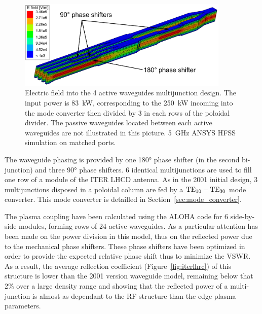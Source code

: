{\begin{figure}[h]
	\centering{}\includegraphics[width=0.9\textwidth]{figures/chap3/ITER_antenna/LH4ITER_MJ_4awg}
	\caption{Electric field into the 4 active waveguides multijunction design.
		The input power is 83~kW, corresponding to the 250~kW incoming
		into the mode converter then divided by 3 in each rows of the poloidal
		divider. The passive waveguides located between each active waveguides
		are not illustrated in this picture. 5~GHz ANSYS HFSS simulation
		on matched ports.}
	\label{fig:Illustration_4awg_design} 
\end{figure}

The waveguide phasing is provided by one 180\si{\degree} phase shifter (in the second bi-junction) and three 90\si{\degree} phase shifters. 6 identical multijunctions are used to fill one row of a module of the ITER LHCD antenna. As in the 2001 initial design, 3 multijunctions disposed in a poloidal column are fed by a ${\mathrm{TE}}_{10}-{\mathrm{TE}}_{30}$ mode converter. This mode converter is detailled in Section~\ref{sec:mode_converter}.

The plasma coupling have been calculated using the ALOHA code for 6 side-by-side modules, forming rows of 24 active waveguides. As a particular attention has been made on the power division in this model, thus on the reflected power due to the mechanical phase shifters. These phase shifters have been optimized in order to provide the expected relative phase shift thus to minimize the VSWR. As a result, the average reflection coefficient (Figure~\ref{fig:iterlhrc}) of this structure is lower than the 2001 version waveguide model, remaining below that 2\% over a large density range and showing that the reflected power of a multi-junction is almost as dependant to the RF structure than the edge plasma parameters.

}
